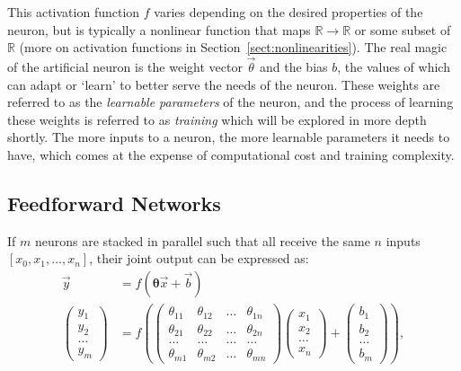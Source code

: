 This activation function $f$ varies depending on the desired properties of the neuron, but is typically a nonlinear function
that maps $\mathbb{R}\rightarrow\mathbb{R}$ or some subset of $\mathbb{R}$  (more on activation functions in Section~\ref{sect:nonlinearities}). The real magic of the artificial neuron is
the weight vector $\vec{\theta}$ and the bias $b$, the values of which can adapt or `learn' to better serve the needs of the neuron. These weights
are referred to as the \textit{learnable parameters} of the neuron, and the process of learning these weights is referred to as
\textit{training} which will be explored in more depth shortly. The more inputs to a neuron, the more learnable parameters it needs to have,
which comes at the expense of computational cost and training complexity.

\subsection{Feedforward Networks} \label{sect:ffw}
If $m$ neurons are stacked in parallel such that all receive the same $n$ inputs $[x_0, x_1, \dots, x_n]$, their
joint output can be expressed as:
\begin{align}
	\vec{y} &= f(\mathbf{\theta}\vec{x} + \vec{b}) \\
	\begin{pmatrix}
		y_{1} \\
		y_{2} \\
		\dots \\
		y_{m}
	\end{pmatrix} &= f \left( \begin{pmatrix}
		\theta_{11} & \theta_{12} & \dots & \theta_{1n} \\
		\theta_{21} & \theta_{22} & \dots & \theta_{2n} \\
		\dots    & \dots    & \dots & \dots \\
		\theta_{m1} & \theta_{m2} & \dots & \theta_{mn}
	\end{pmatrix}\begin{pmatrix}
		x_{1} \\
		x_{2} \\
		\dots \\
		x_{n}
	\end{pmatrix} + \begin{pmatrix}
		b_{1} \\
		b_{2} \\
		\dots \\
		b_{m}
	\end{pmatrix}\right),
\end{align}

